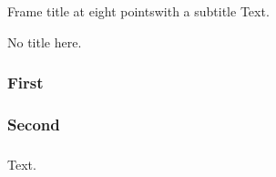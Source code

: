 \documentclass[8pt]{beamer}
\begin{document}
\begin{frame}{Frame title at eight points}{with a subtitle}
Text.
\end{frame}
\begin{frame}{}
No title here.
\end{frame}
\begin{frame}
\frametitle{First}
\frametitle{Second}
\frametitle{}
Text.
\end{frame}
\end{document}
